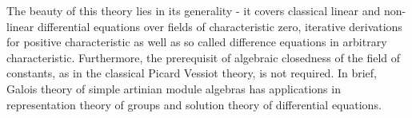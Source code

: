 \indent The beauty of this theory lies in its generality - it covers classical linear and non-linear differential equations over fields of characteristic zero, iterative derivations for positive characteristic as well as so called difference equations in arbitrary characteristic. Furthermore, the prerequisit of algebraic closedness of the field of constants, as in the classical Picard Vessiot theory, is not required. In brief, Galois theory of simple artinian module algebras has applications in representation theory of groups and solution theory of differential equations.%
